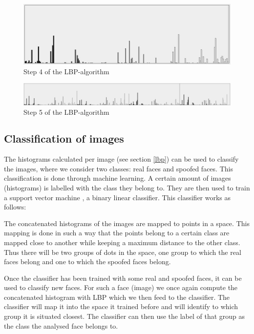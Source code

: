 \documentclass{sig-alternate-br}
\begin{document}
\begin{figure}[h]
	\includegraphics[scale=0.2]{histogram}
	\caption{Step 4  of the LBP-algorithm}
	\label{fig:histogram}
\end{figure}

\begin{figure}[h]
	\includegraphics[scale=0.1]{concat_histograms}
	\caption{Step 5 of the LBP-algorithm}
	\label{fig:concat_histograms}
\end{figure}

\subsection{Classification of images}
The histograms calculated per image (see section \ref{lbp}) can be used to classify the images, where we consider two classes: real faces and spoofed faces. This classification is done through machine learning. A certain amount of images (histograms) is labelled with the class they belong to. They are then used to train a support vector machine \cite{hsu2003practical}, a binary linear classifier. This classifier works as follows:

The concatenated histograms of the images are mapped to points in a space. This mapping is done in such a way that the points belong to a certain class are mapped close to another while keeping a maximum distance to the other class. Thus there will be two groups of dots in the space, one group to which the real faces belong and one to which the spoofed faces belong.

Once the classifier has been trained with some real and spoofed faces, it can be used to classify new faces. For such a face (image) we once again compute the concatenated histogram with LBP which we then feed to the classifier. The classifier will map it into the space it trained before and will identify to which group it is situated closest. The classifier can then use the label of that group as the class the analysed face belongs to.
\end{document}
